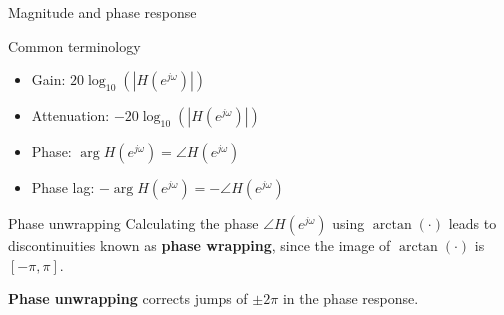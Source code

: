 \documentclass[10pt]{beamer}
\begin{document}
%
\begin{frame}{Magnitude and phase response}
	\begin{block}{Common terminology}
		\begin{itemize}
			\item Gain: $20\log_{10}(|H(e^{j\omega})|)$
			\item Attenuation: $-20\log_{10}(|H(e^{j\omega})|)$
			\item Phase: $\arg H(e^{j\omega}) = \angle H(e^{j\omega})$
			\item Phase lag: $-\arg H(e^{j\omega}) = -\angle H(e^{j\omega})$
		\end{itemize}
	\end{block}
	
	\begin{center}
	\end{center}
\end{frame}

%
\begin{frame}{Phase unwrapping}
	Calculating the phase $\angle H(e^{j\omega})$ using $\arctan(\cdot)$ leads to discontinuities known as \textbf{phase wrapping}, since the image of $\arctan(\cdot)$ is $[-\pi, \pi]$.
	
	\textbf{Phase unwrapping} corrects jumps of $\pm2\pi$ in the phase response.
	
	\begin{center}
		\resizebox{\textwidth}{!}{}
	\end{center}	
	
\end{frame}
\end{document}
